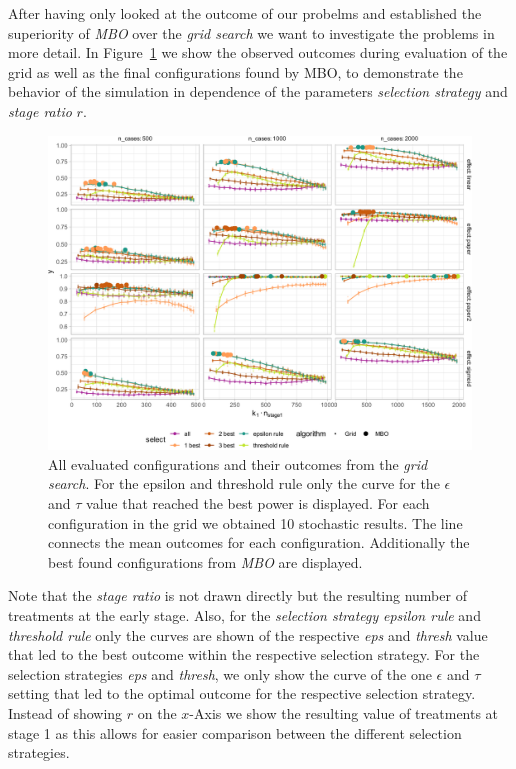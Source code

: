\documentclass[bimj,fleqn]{w-art}
\theoremstyle{plain}
\theoremstyle{definition}
\begin{document}
After having only looked at the outcome of our probelms and established the superiority of \emph{MBO} over the \emph{grid search} we want to investigate the problems in more detail.
In Figure~\ref{fig:plot_allbest} we show the observed outcomes during evaluation of the grid as well as the final configurations found by MBO, to demonstrate the behavior of the simulation in dependence of the parameters \emph{selection strategy} and \emph{stage ratio} $r$.
\begin{figure}[htb]
\centering
\includegraphics[width=\linewidth]{generated/figures/plot_allbest.pdf}
\caption{%
  All evaluated configurations and their outcomes from the \emph{grid search}.
  For the epsilon and threshold rule only the curve for the $\epsilon$ and $\tau$ value that reached the best power is displayed.
  For each configuration in the grid we obtained 10 stochastic results.
  The line connects the mean outcomes for each configuration.
  Additionally the best found configurations from \emph{MBO} are displayed.
  }
\label{fig:plot_allbest}
\end{figure}
Note that the \emph{stage ratio} is not drawn directly but the resulting number of treatments at the early stage.
Also, for the \emph{selection strategy} \emph{epsilon rule} and \emph{threshold rule} only the curves are shown of the respective \emph{eps} and \emph{thresh} value that led to the best outcome within the respective selection strategy.
For the selection strategies \emph{eps} and \emph{thresh}, we only show the curve of the one $\epsilon$ and $\tau$ setting that led to the optimal outcome for the respective selection strategy.
Instead of showing $r$ on the $x$-Axis we show the resulting value of treatments at stage 1 as this allows for easier comparison between the different selection strategies.
\end{document}

